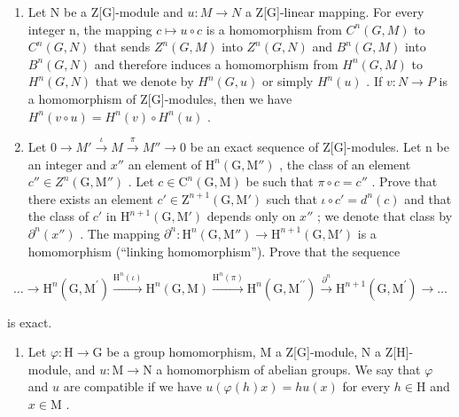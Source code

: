 \begin{enumerate}
\def\labelenumi{\alph{enumi})}
\setcounter{enumi}{1}
\item
  Let N be a Z{[}G{]}-module and \(u : M \to N\) a Z{[}G{]}-linear mapping. For every integer n, the mapping \(c \mapsto u \circ c\) is a homomorphism from \(C^{n}(G, M)\) to \(C^{n}(G, N)\) that sends \(Z^{n}(G, M)\) into \(Z^{n}(G, N)\) and \(B^{n}(G, M)\) into \(B^{n}(G, N)\) and therefore induces a homomorphism from \(H^{n}(G, M)\) to \(H^{n}(G, N)\) that we denote by \(H^{n}(G, u)\) or simply \(H^{n}(u)\) . If \(v : N \to P\) is a homomorphism of Z{[}G{]}-modules, then we have \(H^{n}(v \circ u) = H^{n}(v) \circ H^{n}(u)\) .
\item
  Let \(0 \to M' \xrightarrow{\iota} M \xrightarrow{\pi} M'' \to 0\) be an exact sequence of Z{[}G{]}-modules. Let n be an integer and \(x''\) an element of \(\mathrm{H}^{n}(\mathrm{G},\mathrm{M}'')\) , the class of an element \(c'' \in Z^{n}(\mathrm{G},\mathrm{M}'')\) . Let \(c \in \mathrm{C}^{n}(\mathrm{G},\mathrm{M})\) be such that \(\pi \circ c = c''\) . Prove that there exists an element \(c' \in \mathrm{Z}^{n+1}(\mathrm{G},\mathrm{M}')\) such that \(\iota \circ c' = d^{n}(c)\) and that the class of \(c'\) in \(\mathrm{H}^{n+1}(\mathrm{G},\mathrm{M}')\) depends only on \(x''\) ; we denote that class by \(\partial^{n}(x'')\) . The mapping \(\partial^{n}: \mathrm{H}^{n}(\mathrm{G},\mathrm{M}'') \to \mathrm{H}^{n+1}(\mathrm{G},\mathrm{M}')\) is a homomorphism (``linking homomorphism''). Prove that the sequence
\end{enumerate}

\[
\dots \longrightarrow \mathrm{H} ^ {n} (\mathrm{G}, \mathrm{M} ^ {\prime}) \stackrel {{\mathrm{H} ^ {n} (\iota)}} {{\longrightarrow}} \mathrm{H} ^ {n} (\mathrm{G}, \mathrm{M}) \stackrel {{\mathrm{H} ^ {n} (\pi)}} {{\longrightarrow}} \mathrm{H} ^ {n} (\mathrm{G}, \mathrm{M} ^ {\prime \prime}) \stackrel {{\partial^ {n}}} {{\longrightarrow}} \mathrm{H} ^ {n + 1} (\mathrm{G}, \mathrm{M} ^ {\prime}) \longrightarrow \dots
\]

is exact.

\begin{enumerate}
\def\labelenumi{\arabic{enumi})}
\setcounter{enumi}{1}
\tightlist
\item
  Let \(\varphi : \mathrm{H} \to \mathrm{G}\) be a group homomorphism, M a Z{[}G{]}-module, N a Z{[}H{]}-module, and \(u : \mathrm{M} \to \mathrm{N}\) a homomorphism of abelian groups. We say that \(\varphi\) and \(u\) are compatible if we have \(u(\varphi(h)x) = hu(x)\) for every \(h \in \mathrm{H}\) and \(x \in \mathrm{M}\) .
\end{enumerate}

